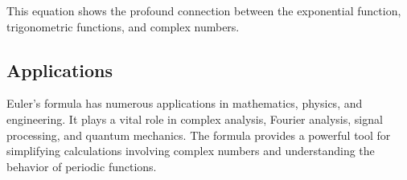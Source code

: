 \documentclass[12pt]{article}
\begin{document}
This equation shows the profound connection between the exponential function, trigonometric functions, and complex numbers.\cite{ref=inbook}

\subsection{Applications}

Euler's formula has numerous applications in mathematics, physics, and engineering. It plays a vital role in complex analysis, Fourier analysis, signal processing, and quantum mechanics. The formula provides a powerful tool for simplifying calculations involving complex numbers and understanding the behavior of periodic functions.


\end{document}
